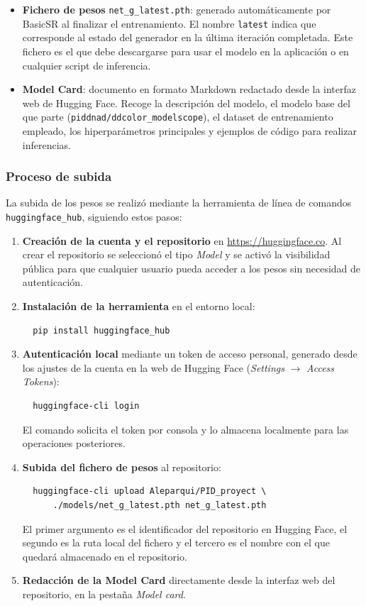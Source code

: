 \documentclass[a4paper]{article}
\begin{document}
\begin{itemize}
  \item \textbf{Fichero de pesos} \texttt{net\_g\_latest.pth}: generado automáticamente por BasicSR al finalizar el entrenamiento. El nombre \texttt{latest} indica que corresponde al estado del generador en la última iteración completada. Este fichero es el que debe descargarse para usar el modelo en la aplicación o en cualquier script de inferencia.

  \item \textbf{Model Card}: documento en formato Markdown redactado desde la interfaz web de Hugging Face. Recoge la descripción del modelo, el modelo base del que parte (\texttt{piddnad/ddcolor\_modelscope}), el dataset de entrenamiento empleado, los hiperparámetros principales y ejemplos de código para realizar inferencias.
\end{itemize}

\subsubsection{Proceso de subida}

La subida de los pesos se realizó mediante la herramienta de línea de comandos \texttt{huggingface\_hub}, siguiendo estos pasos:

\begin{enumerate}
  \item \textbf{Creación de la cuenta y el repositorio} en \url{https://huggingface.co}. Al crear el repositorio se seleccionó el tipo \textit{Model} y se activó la visibilidad pública para que cualquier usuario pueda acceder a los pesos sin necesidad de autenticación.

  \item \textbf{Instalación de la herramienta} en el entorno local:
  \begin{verbatim}
  pip install huggingface_hub
  \end{verbatim}

  \item \textbf{Autenticación local} mediante un token de acceso personal, generado desde los ajustes de la cuenta en la web de Hugging Face (\textit{Settings} $\rightarrow$ \textit{Access Tokens}):
  \begin{verbatim}
  huggingface-cli login
  \end{verbatim}
  El comando solicita el token por consola y lo almacena localmente para las operaciones posteriores.

  \item \textbf{Subida del fichero de pesos} al repositorio:
  \begin{verbatim}
  huggingface-cli upload Aleparqui/PID_proyect \
      ./models/net_g_latest.pth net_g_latest.pth
  \end{verbatim}
  El primer argumento es el identificador del repositorio en Hugging Face, el segundo es la ruta local del fichero y el tercero es el nombre con el que quedará almacenado en el repositorio.

  \item \textbf{Redacción de la Model Card} directamente desde la interfaz web del repositorio, en la pestaña \textit{Model card}.
\end{enumerate}
\end{document}
